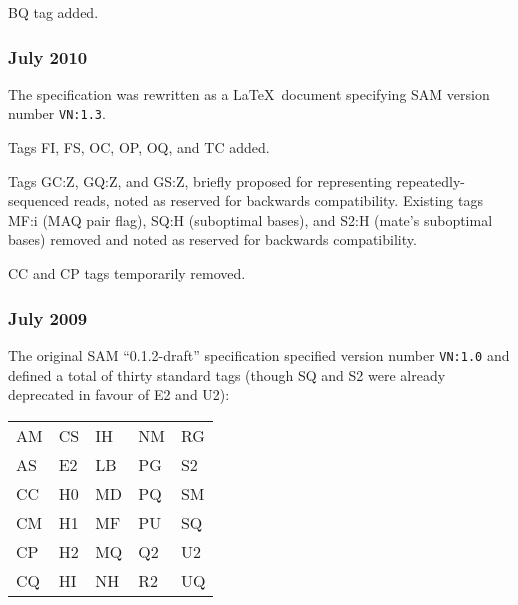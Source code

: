 \documentclass[10pt]{article}
\begin{document}
\begin{appendices}
BQ tag added.

\subsubsection*{July 2010}

The specification was rewritten as a \LaTeX\ document specifying SAM version number {\tt VN:1.3}.

\gap
Tags FI, FS, OC, OP, OQ, and TC added.

Tags GC:Z, GQ:Z, and GS:Z, briefly proposed for representing repeatedly-sequenced reads, noted as reserved for backwards compatibility.
Existing tags MF:i (MAQ pair flag), SQ:H (suboptimal bases), and S2:H (mate's suboptimal bases) removed and noted as reserved for backwards compatibility.

CC and CP tags temporarily removed.

\subsubsection*{July 2009}

The original SAM ``0.1.2-draft'' specification specified version number {\tt VN:1.0} and defined a total of thirty standard tags (though SQ and S2 were already deprecated in favour of E2 and U2):

\begin{center}
\begin{tabular}{l@{\qquad}l@{\qquad}l@{\qquad}l@{\qquad}l}
AM & CS & IH & NM & RG \\
AS & E2 & LB & PG & S2 \\
CC & H0 & MD & PQ & SM \\
CM & H1 & MF & PU & SQ \\
CP & H2 & MQ & Q2 & U2 \\
CQ & HI & NH & R2 & UQ
\end{tabular}
\end{center}

\end{appendices}
\end{document}
